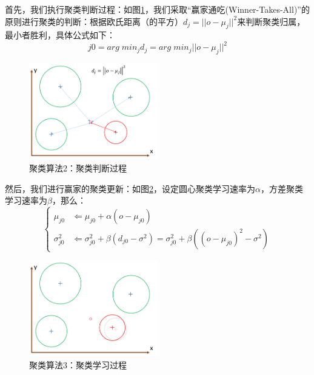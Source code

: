 首先，我们执行聚类判断过程：如图\ref{fig:onlineclus2}，我们采取“赢家通吃(Winner-Takes-All)”的原则进行聚类的判断：根据欧氏距离（的平方）$d_j = ||o - \mu_j||^2$来判断聚类归属，最小者胜利，具体公式如下：
\begin{equation}
j0 = arg\;min_j d_j = arg\;min_j ||o - \mu_j||^2
\end{equation}

\begin{figure}[htbp]
   \centering
   \includegraphics[width=0.5\textwidth]{OnlineClustering2.png} %
   \caption{聚类算法2：聚类判断过程}
   \label{fig:onlineclus2}
\end{figure}

然后，我们进行赢家的聚类更新：如图\ref{fig:onlineclus3}，设定圆心聚类学习速率为$\alpha$，方差聚类学习速率为$\beta$，那么：
\begin{equation}
\left\{
\begin{aligned}
\mu_{j0} & \Leftarrow \mu_{j0} + \alpha (o - \mu_{j0}) \\
\sigma^2_{j0} & \Leftarrow \sigma^2_{j0} + \beta (d_{j0} - \sigma^2)  = \sigma^2_{j0} + \beta ((o-\mu_{j0})^2 - \sigma^2)
\end{aligned}
\right.
\end{equation}

\begin{figure}[htbp]
   \centering
   \includegraphics[width=0.5\textwidth]{OnlineClustering3.png} %
   \caption{聚类算法3：聚类学习过程}
   \label{fig:onlineclus3}
\end{figure}

